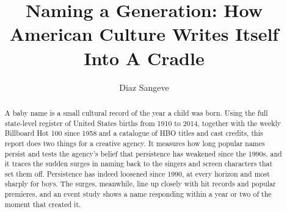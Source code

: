 \documentclass[11pt,preprint]{elsarticle}
\numberwithin{equation}{section}
\numberwithin{figure}{section}
\numberwithin{table}{section}
\begin{document}
\begin{frontmatter}  %

\title{Naming a Generation: How American Culture Writes Itself Into A
Cradle}





\author[Add1]{Diaz Sangeve}





\address[Add1]{Stellenbosch University, Stellenbosch, South Africa}


\begin{abstract}
\small{
A baby name is a small cultural record of the year a child was born.
Using the full state-level register of United States births from 1910 to
2014, together with the weekly Billboard Hot 100 since 1958 and a
catalogue of HBO titles and cast credits, this report does two things
for a creative agency. It measures how long popular names persist and
tests the agency's belief that persistence has weakened since the 1990s,
and it traces the sudden surges in naming back to the singers and screen
characters that set them off. Persistence has indeed loosened since
1990, at every horizon and most sharply for boys. The surges, meanwhile,
line up closely with hit records and popular premieres, and an event
study shows a name responding within a year or two of the moment that
created it.
}
\end{abstract}

\vspace{1cm}





\vspace{0.5cm}

\end{frontmatter}

\setcounter{footnote}{0}


\renewcommand{\contentsname}{Table of Contents}
{\tableofcontents}

\pagestyle{fancy}
\chead{}
\rhead{}
\lfoot{}
\lhead{}
\cfoot{}

\end{document}
